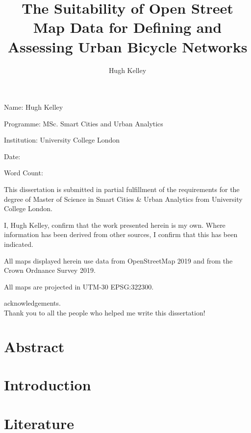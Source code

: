 \documentclass[hidelinks,11pt]{article} %
\title{The Suitability of Open Street Map Data for Defining and Assessing Urban Bicycle Networks}
\author{Hugh Kelley}
\begin{document}
\maketitle

\pagebreak


Name: Hugh Kelley

Programme: MSc. Smart Cities and Urban Analytics

Institution: University College London

Date:

Word Count:

This dissertation is submitted in partial fulfillment of the requirements for the degree of Master of Science in Smart Cities \& Urban Analytics from University College London.

I, Hugh Kelley, confirm that the work presented herein is my own. Where information has been derived from other sources, I confirm that this has been indicated.
\pagebreak

All maps displayed herein use data from OpenStreetMap 2019 and from the Crown Ordnance Survey 2019.

\medskip
 
All maps are projected in UTM-30 EPSG:322300.

\pagebreak

acknowledgements.\\

Thank you to all the people who helped me write this dissertation! 

\pagebreak

\section{Abstract}


\pagebreak

\tableofcontents
\pagebreak

\listoffigures
\pagebreak

\listoftables
\pagebreak

\section{Introduction}

	

\section{Literature}
\end{document}
